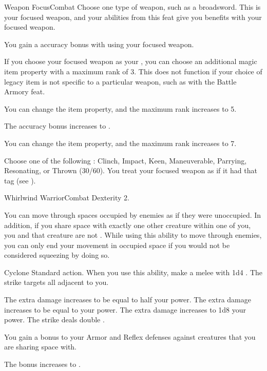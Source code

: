   \begin{feat}{Weapon Focus}{Combat}
     Choose one type of weapon, such as a broadsword.
    This is your focused weapon, and your abilities from this feat give you benefits with your focused weapon.

     You gain a  accuracy bonus with  using your focused weapon.

     If you choose your focused weapon as your , you can choose an additional magic item property with a maximum rank of 3.
    This does not function if your choice of legacy item is not specific to a particular weapon, such as with the Battle Armory feat.

     You can change the item property, and the maximum rank increases to 5.

     The accuracy bonus increases to .

     You can change the item property, and the maximum rank increases to 7.

     Choose one of the following : Clinch, Impact, Keen, Maneuverable, Parrying, Resonating, or Thrown (30/60).
    You treat your focused weapon as if it had that tag (see ).
  \end{feat}

  \begin{feat}{Whirlwind Warrior}{Combat}
    \featpre Dexterity 2.

     You can move through spaces occupied by enemies as if they were unoccupied.
    In addition, if you share space with exactly one other creature within one  of you, you and that creature are not \squeezing.
    While using this ability to move through enemies, you can only end your movement in occupied space if you would not be considered squeezing by doing so.

    \begin{activeability}{Cyclone}
      \abilityusagetime Standard action.
      \rankline
      When you use this ability, make a melee  with 1d4 .
      The strike targets all  adjacent to you.

      \rankline
       The extra damage increases to be equal to half your power.
       The extra damage increases to be equal to your power.
       The extra damage increases to 1d8 \add your power.
       The strike deals double .
    \end{activeability}

     You gain a  bonus to your Armor and Reflex defenses against creatures that you are sharing space with.

     The bonus increases to .
  \end{feat}

